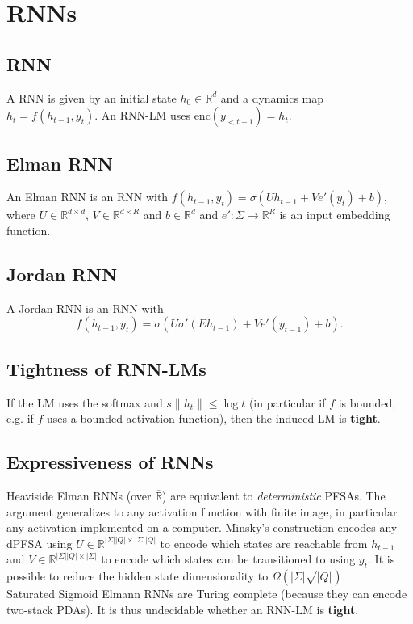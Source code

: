 \section{RNNs}
\subsection*{RNN}
A RNN is given by an initial state $h_0\in\mathbb{R}^d$ and a dynamics map $h_{t}=f(h_{t-1},y_{t})$. An RNN-LM uses $\text{enc}(y_{<t+1})=h_t$.

\subsection*{Elman RNN}
An Elman RNN is an RNN with $f(h_{t-1},y_t)=\sigma(U h_{t-1}+Ve'( y_t)+b)$, where $U\in\mathbb{R}^{d\times d}$, $V\in \mathbb{R}^{d\times R}$ and $b\in\mathbb{R}^d$ and $e':\Sigma\rightarrow\mathbb{R}^R$ is an input embedding function.\\

\subsection*{Jordan RNN}
A Jordan RNN is an RNN with $$f(h_{t-1},y_t)=\sigma(U \sigma'(Eh_{t-1})+V e'(y_{t-1})+b).$$

\subsection*{Tightness of RNN-LMs}
If the LM uses the softmax and $s\|h_t\|\leq\log t$ (in particular if $f$ is bounded, e.g. if $f$ uses a bounded activation function), then the induced LM is \textbf{tight}.

\subsection*{Expressiveness of RNNs}
Heaviside Elman RNNs (over $\overline{\mathbb{R}}$) are equivalent to \textit{deterministic} PFSAs. The argument generalizes to any activation function with finite image, in particular any activation implemented on a computer. Minsky's construction encodes any dPFSA using $U\in \mathbb{R}^{|\Sigma||Q|\times |\Sigma||Q|}$ to encode which states are reachable from $h_{t-1}$ and $V\in\mathbb{R}^{|\Sigma||Q|\times |\Sigma|}$ to encode which states can be transitioned to using $y_t$. It is possible to reduce the hidden state dimensionality to
$\Omega(|\Sigma|\sqrt{|Q|}).$\\
Saturated Sigmoid Elmann RNNs are Turing complete (because they can encode two-stack PDAs). It is thus undecidable whether an RNN-LM is \textbf{tight}.
